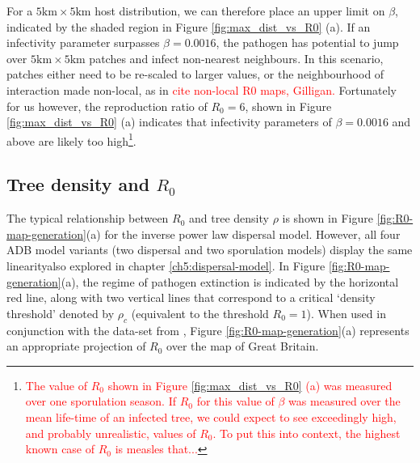 For a $5\mathrm{km} \times 5 \mathrm{km}$ host distribution, we can therefore place an upper limit on $\beta$, indicated by the shaded region in Figure \ref{fig:max_dist_vs_R0} (a). If an infectivity parameter surpasses $\beta = 0.0016$, the pathogen has potential to jump over $5\mathrm{km} \times 5 \mathrm{km}$ patches and infect non-nearest neighbours. In this scenario, patches either need to be re-scaled to larger values, or the neighbourhood of interaction made non-local, as in \textcolor{red}{cite non-local R0 maps, Gilligan.} Fortunately for us however, the reproduction ratio of $R_0=6$, shown in Figure \ref{fig:max_dist_vs_R0} (a) indicates that infectivity parameters of $\beta = 0.0016$ and above are likely too high\footnote{\textcolor{red}{The value of $R_0$ shown in Figure \ref{fig:max_dist_vs_R0} (a) was measured over one sporulation season. If $R_0$ for this value of $\beta$ was measured over the mean life-time of an infected tree, we could expect to see exceedingly high, and probably unrealistic, values of $R_0$. To put this into context, the highest known case of $R_0$ is measles that...}}.

\subsection{Tree density and $R_0$}

The typical relationship between $R_0$ and tree density $\rho$ is shown in Figure \ref{fig:R0-map-generation}(a) for the inverse power law dispersal model. However, all four ADB model variants (two dispersal and two sporulation models) display the same linearity\textemdash also explored in chapter \ref{ch5:dispersal-model}. In Figure \ref{fig:R0-map-generation}(a), the regime of pathogen extinction is indicated by the horizontal red line, along with two vertical lines that correspond to a critical `density threshold' denoted by $\rho_c$ (equivalent to the threshold $R_0 = 1$). When used in conjunction with the data-set from \cite{hill.data}, Figure \ref{fig:R0-map-generation}(a) represents an appropriate projection of $R_0$ over the map of Great Britain.

